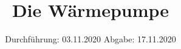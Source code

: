 

\subject{D206}
\title{Die Wärmepumpe}
\date{%
  Durchführung: 03.11.2020
  \hspace{3em}
  Abgabe: 17.11.2020
}



\maketitle
\thispagestyle{empty}
\tableofcontents
\newpage






\printbibliography{}


